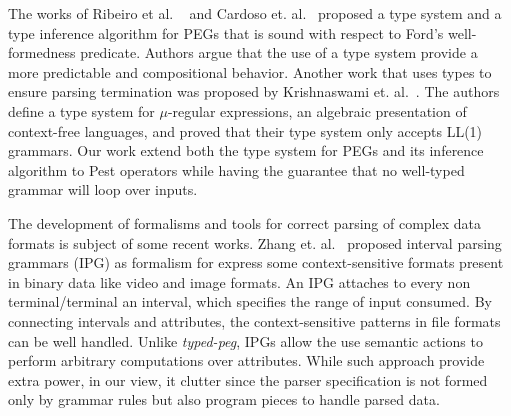 \documentclass[sigplan,screen]{acmart}
\theoremstyle{definition}
\begin{document}
The works of Ribeiro et al. ~\cite{Ribeiro19} and Cardoso et. al.~\cite{Cardoso23}
proposed a type system and a type inference algorithm for PEGs that is sound with
respect to Ford's well-formedness predicate. Authors argue that the use
of a type system provide a more predictable and compositional behavior.
Another work that uses types to ensure parsing termination was proposed by
Krishnaswami et. al.~\cite{Krishnaswami19}. The authors define a type system
for $\mu$-regular expressions, an algebraic presentation of context-free
languages, and proved that their type system only accepts LL(1) grammars.
Our work extend both the type system for PEGs and its inference algorithm to
Pest operators while having the guarantee that no well-typed grammar
will loop over inputs.

The development of formalisms and tools for correct parsing of complex data
formats is subject of some recent works.  Zhang et. al.~\cite{Zhang23} proposed
interval parsing grammars (IPG) as formalism for express some context-sensitive
formats present in binary data like video and image formats. An IPG attaches to
every non terminal/terminal an interval, which specifies the range of input consumed.
By connecting intervals and attributes, the context-sensitive patterns in file formats
can be well handled. Unlike \emph{typed-peg}, IPGs allow the use semantic actions to
perform arbitrary computations over attributes. While such approach provide extra
power, in our view, it clutter since the parser specification is not formed only by
grammar rules but also program pieces to handle parsed data.
\end{document}
